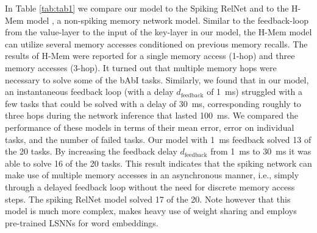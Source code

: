 \documentclass{article}
\begin{document}
In Table \ref{tab:tab1} we compare our model to the Spiking RelNet \cite{plank2021long} and to the H-Mem model \cite{limbacher2020hmem}, a non-spiking memory network model. Similar to the feedback-loop from the value-layer to the input of the key-layer in our model, the H-Mem model can utilize several memory accesses conditioned on previous memory recalls. The results of H-Mem were reported for a single memory access (1-hop) and three memory accesses (3-hop). It turned out that multiple memory hops were necessary to solve some of the bAbI tasks. Similarly, we found that in our model, an instantaneous feedback loop (with a delay $d_\mathrm{feedback}$ of \SI{1}{\ms}) struggled with a few tasks that could be solved with a delay of \SI{30}{\ms}, corresponding roughly to three hops during the network inference that lasted \SI{100}{\ms}. We compared the performance of these models in terms of their mean error, error on individual tasks, and the number of failed tasks. 
Our model with \SI{1}{\ms} feedback solved \num{13} of the \num{20} tasks. By increasing the feedback delay $d_\mathrm{feedback}$ from \SI{1}{\ms} to \SI{30}{\ms} it was able to solve \num{16} of the \num{20} tasks. This result indicates that the spiking network can make use of multiple memory accesses in an asynchronous manner, i.e., simply through a delayed feedback loop without the need for discrete memory access steps.  
The spiking RelNet model solved \num{17} of the \num{20}. Note however that this model is much more complex, makes heavy use of weight sharing and employs pre-trained LSNNs for word embeddings.
\end{document}
